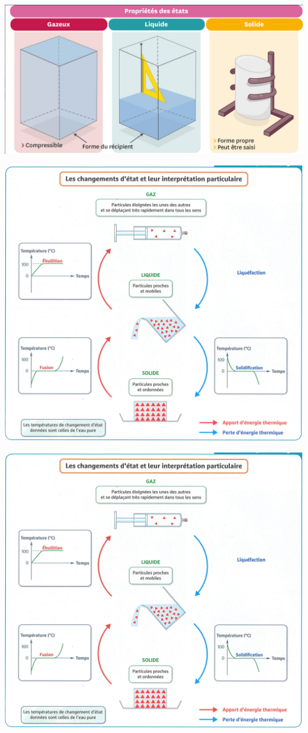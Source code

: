 \documentclass[12pt,a4paper]{article}
\begin{document}
\begin{center}
	\includegraphics[scale=0.4]{etats}
\end{center}

	\begin{center}
		\includegraphics[scale=0.7]{chgmt_etats}
	\end{center}


	\begin{center}
	\includegraphics[scale=0.7]{chgmt_etats}
\end{center}

\appendix

\end{document}
